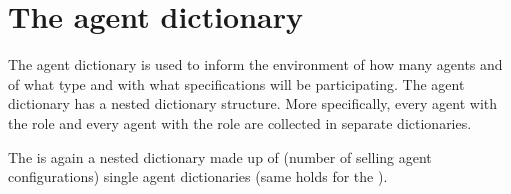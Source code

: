 \documentclass[letterpaper,10pt,english]{sphinxmanual}
\begin{document}
\section{The agent dictionary}
\label{\detokenize{UsingTheEnvironment:the-agent-dictionary}}\label{\detokenize{UsingTheEnvironment:agent-dict}}
\sphinxAtStartPar
The agent dictionary is used to inform the environment of how many agents and of what type and with what specifications
will be participating. The agent dictionary has a nested dictionary structure. More specifically, every agent with the
role  and every agent with the role  are collected in separate dictionaries.

\sphinxAtStartPar
{}

\sphinxAtStartPar
The  is again a nested dictionary made up of  (number of selling agent configurations) single
agent dictionaries (same holds for the ).

\sphinxAtStartPar
{}
\end{document}
